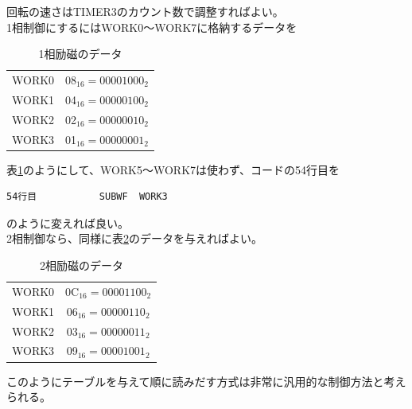\documentclass[a4paper,12pt]{ujarticle}
\begin{document}
     回転の速さはTIMER3のカウント数で調整すればよい。
     \\

     1相制御にするにはWORK0〜WORK7に格納するデータを
     \begin{table}[htbp]
      \begin{center}
       \caption{1相励磁のデータ}
       \label{table:1-data}
       \begin{tabular}{|c|c|}
        \hline
        WORK0 & 08$_{16}=00001000_2$\\
        WORK1 & 04$_{16}=00000100_2$\\
        WORK2 & 02$_{16}=00000010_2$\\
        WORK3 & 01$_{16}=00000001_2$\\ \hline
       \end{tabular}
      \end{center}
     \end{table}
     表\ref{table:1-data}のようにして、WORK5〜WORK7は使わず、コードの54行目を
     \begin{lstlisting}[basicstyle=\ttfamily\footnotesize, frame=single]
54行目           SUBWF  WORK3
     \end{lstlisting}
     のように変えれば良い。
     \\

     2相制御なら、同様に表\ref{table:2-data}のデータを与えればよい。
     \begin{table}[htbp]
      \begin{center}
       \caption{2相励磁のデータ}
       \label{table:2-data}
       \begin{tabular}{|c|c|} \hline
        WORK0 & 0C$_{16}=00001100_2$\\
        WORK1 & 06$_{16}=00000110_2$\\
        WORK2 & 03$_{16}=00000011_2$\\
        WORK3 & 09$_{16}=00001001_2$\\ \hline
       \end{tabular}
      \end{center}
     \end{table}

     このようにテーブルを与えて順に読みだす方式は非常に汎用的な制御方法と考えられる。
\end{document}
